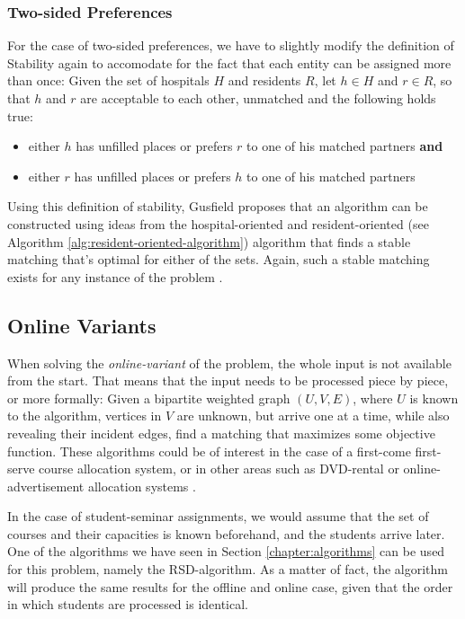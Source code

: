 \subsubsection{Two-sided Preferences}
For the case of two-sided preferences, we have to slightly modify the definition of Stability again to accomodate for the fact that each entity can be assigned more than once: Given the set of hospitals $H$ and residents $R$, let $h \in H$ and $r \in R$, so that $h$ and $r$ are acceptable to each other, unmatched and the following holds true: 
\begin{itemize}
    \item either $h$ has unfilled places or prefers $r$ to one of his matched partners \textbf{and}
    \item either $r$ has unfilled places or prefers $h$ to one of his matched partners
\end{itemize}
Using this definition of stability, Gusfield \cite{Gusfield} proposes that an algorithm can be constructed using ideas from the hospital-oriented and resident-oriented (see Algorithm \ref{alg:resident-oriented-algorithm}) algorithm that finds a stable matching that's optimal for either of the sets. Again, such a stable matching exists for any instance of the problem \cite{Gusfield}.

\subsection{Online Variants}\label{sec:online-variants}
When solving the \emph{online-variant} of the problem, the whole input is not available from the start. That means that the input needs to be processed piece by piece, or more formally: Given a bipartite weighted graph $(U, V, E)$, where $U$ is known to the algorithm, vertices in $V$ are unknown, but arrive one at a time, while also revealing their incident edges, find a matching that maximizes some objective function. These algorithms could be of interest in the case of a first-come first-serve course allocation system, or in other areas such as DVD-rental or online-advertisement allocation systems \cite{Mehta:Online}.

In the case of student-seminar assignments, we would assume that the set of courses and their capacities is known beforehand, and the students arrive later. One of the algorithms we have seen in Section \ref{chapter:algorithms} can be used for this problem, namely the RSD-algorithm. As a matter of fact, the algorithm will produce the same results for the offline and online case, given that the order in which students are processed is identical.

